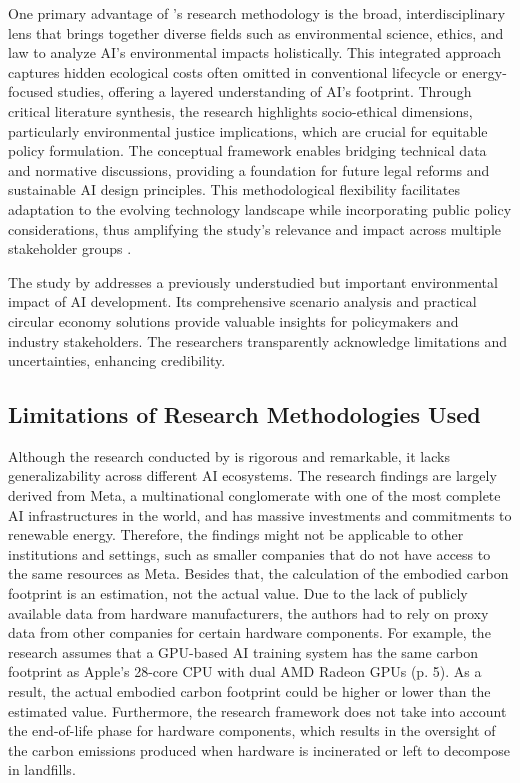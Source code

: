 \documentclass[a4paper, 12pt]{article}
\begin{document}
\par One primary advantage of \citet{Zhuk2023}'s research methodology is the broad, interdisciplinary lens that brings together diverse fields such as environmental science, ethics, and law to analyze AI’s environmental impacts holistically. This integrated approach captures hidden ecological costs often omitted in conventional lifecycle or energy-focused studies, offering a layered understanding of AI's footprint. Through critical literature synthesis, the research highlights socio-ethical dimensions, particularly environmental justice implications, which are crucial for equitable policy formulation. The conceptual framework enables bridging technical data and normative discussions, providing a foundation for future legal reforms and sustainable AI design principles. This methodological flexibility facilitates adaptation to the evolving technology landscape while incorporating public policy considerations, thus amplifying the study’s relevance and impact across multiple stakeholder groups \citep[pp.~960--963]{Zhuk2023}.\par The study by \cite{wang_2024_ewaste} addresses a previously understudied but important environmental impact of AI development. Its comprehensive scenario analysis and practical circular economy solutions provide valuable insights for policymakers and industry stakeholders. The researchers transparently acknowledge limitations and uncertainties, enhancing credibility.

\subsection{Limitations of Research Methodologies Used}
Although the research conducted by \citet{Wu2022} is rigorous and remarkable, it lacks generalizability across different AI ecosystems. The research findings are largely derived from Meta, a multinational conglomerate with one of the most complete AI infrastructures in the world, and has massive investments and commitments to renewable energy. Therefore, the findings might not be applicable to other institutions and settings, such as smaller companies that do not have access to the same resources as Meta. Besides that, the calculation of the embodied carbon footprint is an estimation, not the actual value. Due to the lack of publicly available data from hardware manufacturers, the authors had to rely on proxy data from other companies for certain hardware components. For example, the research assumes that a GPU-based AI training system has the same carbon footprint as Apple's 28-core CPU with dual AMD Radeon GPUs (p. 5). As a result, the actual embodied carbon footprint could be higher or lower than the estimated value. Furthermore, the research framework does not take into account the end-of-life phase for hardware components, which results in the oversight of the carbon emissions produced when hardware is incinerated or left to decompose in landfills.
\end{document}

